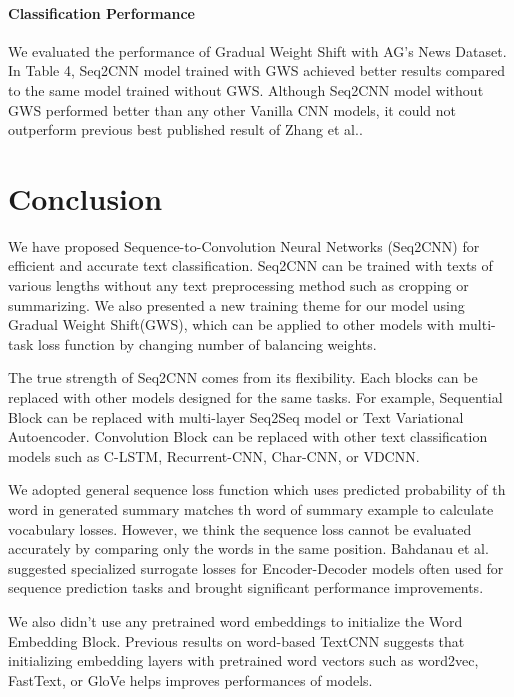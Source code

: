\documentclass{article}
\begin{document}
\paragraph{Classification Performance}We evaluated the performance of Gradual Weight Shift with AG's News Dataset. In Table 4, Seq2CNN model trained with GWS achieved better results compared to the same model trained without GWS. Although Seq2CNN model without GWS performed better than any other Vanilla CNN models, it could not outperform previous best published result of Zhang et al.\cite{DBLP:journals/corr/ZhangZL15}.   

\section{Conclusion}
We have proposed Sequence-to-Convolution Neural Networks (Seq2CNN) for efficient and accurate text classification. Seq2CNN can be trained with texts of various lengths without any text preprocessing method such as cropping or summarizing. We also presented a new training theme for our model using Gradual Weight Shift(GWS), which can be applied to other models with multi-task loss function by changing number of balancing weights.

The true strength of Seq2CNN comes from its flexibility. Each blocks can be replaced with other models designed for the same tasks. For example, Sequential Block can be replaced with multi-layer Seq2Seq model\cite{tensorflow2015-whitepaper} or Text Variational Autoencoder\cite{DBLP:journals/corr/SemeniutaSB17}. Convolution Block can be replaced with other text classification models such as C-LSTM\cite{DBLP:journals/corr/ZhouSLL15b}, Recurrent-CNN\cite{AAAI159745}, Char-CNN\cite{DBLP:journals/corr/ZhangZL15}, or VDCNN\cite{DBLP:journals/corr/ConneauSBL16}.

We adopted general sequence loss function which uses predicted probability of th word  in generated summary matches th word of summary example  to calculate vocabulary losses. However, we think the sequence loss cannot be evaluated accurately by comparing only the words in the same position. Bahdanau et al.\cite{DBLP:journals/corr/BahdanauSBKCCB15} suggested specialized surrogate losses for Encoder-Decoder models often used for sequence prediction tasks and brought significant performance improvements.

We also didn't use any pretrained word embeddings to initialize the Word Embedding Block. Previous results on word-based TextCNN \cite{DBLP:journals/corr/Kim14f,DBLP:journals/corr/ZhangZL15,AAAI159745} suggests that initializing embedding layers with pretrained word vectors such as word2vec\cite{DBLP:journals/corr/MikolovSCCD13}, FastText\cite{DBLP:journals/corr/JoulinGBM16}, or GloVe\cite{pennington2014glove} helps improves performances of models.
\end{document}
